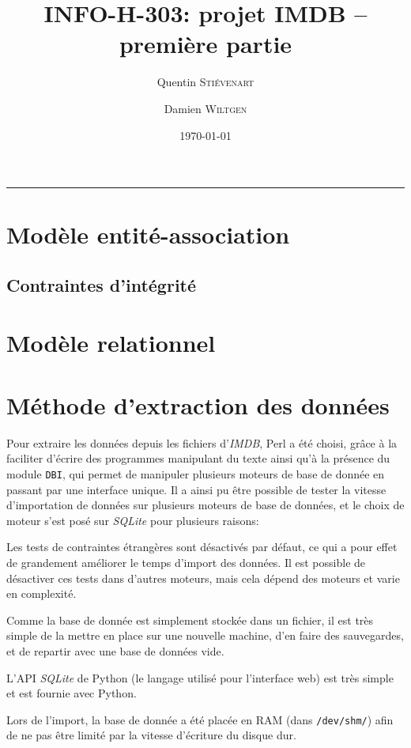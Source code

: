 \documentclass[a4paper,12pt]{article}
\title{INFO-H-303: projet IMDB -- première partie}
\author{Quentin \textsc{Stiévenart} \and Damien \textsc{Wiltgen}}
\date{\today}
\newcommand{\HRule}{\rule{\linewidth}{0.5mm}}
\begin{document}
\maketitle

\HRule

\section{Modèle entité-association}
\subsection{Contraintes d'intégrité}
\section{Modèle relationnel}
\section{Méthode d'extraction des données}
Pour extraire les données depuis les fichiers d'\emph{IMDB}, Perl a
été choisi, grâce à la faciliter d'écrire des programmes manipulant du
texte ainsi qu'à la présence du module \texttt{DBI}, qui permet de
manipuler plusieurs moteurs de base de donnée en passant par une
interface unique. Il a ainsi pu être possible de tester la vitesse
d'importation de données sur plusieurs moteurs de base de données, et
le choix de moteur s'est posé sur \emph{SQLite} pour plusieurs
raisons:

\begin{list}{-}{}
  \item Les tests de contraintes étrangères sont désactivés par
    défaut, ce qui a pour effet de grandement améliorer le temps
    d'import des données. Il est possible de désactiver ces tests dans
    d'autres moteurs, mais cela dépend des moteurs et varie en
    complexité.
  \item Comme la base de donnée est simplement stockée dans un
    fichier, il est très simple de la mettre en place sur une nouvelle
    machine, d'en faire des sauvegardes, et de repartir avec une base
    de données vide.
  \item L'API \emph{SQLite} de Python (le langage utilisé pour
    l'interface web) est très simple et est fournie avec Python.
\end{list}

Lors de l'import, la base de donnée a été placée en RAM (dans
\texttt{/dev/shm/}) afin de ne pas être limité par la vitesse d'écriture du
disque dur.
\end{document}
